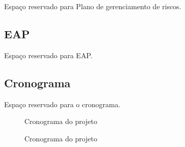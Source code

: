 Espaço reservado para Plano de gerenciamento de riscos.


\subsection{EAP}

Espaço reservado para EAP.

\begin{figure}[H]
	\centering
\end{figure}

\subsection{Cronograma}

Espaço reservado para o cronograma.

\begin{figure}[H]
	\centering
	\caption{Cronograma do projeto} \label{cronograma_1}
\end{figure}

\begin{figure}[H]
	\centering
	\caption{Cronograma do projeto} \label{cronograma_2}
\end{figure}




